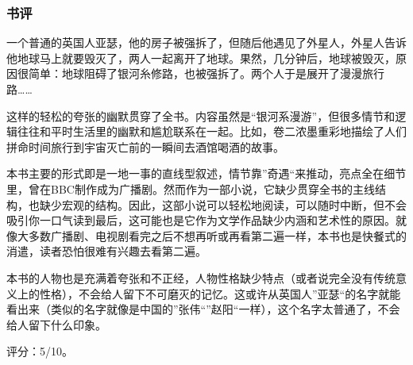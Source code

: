 \subsubsection{书评}
一个普通的英国人亚瑟，他的房子被强拆了，但随后他遇见了外星人，外星人告诉他地球马上就要毁灭了，两人一起离开了地球。果然，几分钟后，地球被毁灭，原因很简单：地球阻碍了银河糸修路，也被强拆了。两个人于是展开了漫漫旅行路……

这样的轻松的夸张的幽默贯穿了全书。内容虽然是“银河系漫游”，但很多情节和逻辑往往和平时生活里的幽默和尴尬联系在一起。比如，卷二浓墨重彩地描绘了人们拼命时间旅行到宇宙灭亡前的一瞬间去酒馆喝酒的故事。

本书主要的形式即是一地一事的直线型叙述，情节靠”奇遇“来推动，亮点全在细节里，曾在BBC制作成为广播剧。然而作为一部小说，它缺少贯穿全书的主线结构，也缺少宏观的结构。因此，这部小说可以轻松地阅读，可以随时中断，但不会吸引你一口气读到最后，这可能也是它作为文学作品缺少内涵和艺术性的原因。就像大多数广播剧、电视剧看完之后不想再听或再看第二遍一样，本书也是快餐式的消遣，读者恐怕很难有兴趣去看第二遍。

本书的人物也是充满着夸张和不正经，人物性格缺少特点（或者说完全没有传统意义上的性格），不会给人留下不可磨灭的记忆。这或许从英国人”亚瑟“的名字就能看出来（类似的名字就像是中国的”张伟“”赵阳“一样），这个名字太普通了，不会给人留下什么印象。

评分：5/10。